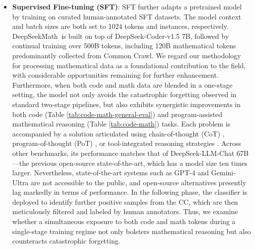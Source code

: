 \begin{itemize}
    \item \textbf{Supervised Fine-tuning (SFT)}: SFT further adapts a pretrained model by training on curated human-annotated SFT datasets. The model context and batch sizes are both set to 1024 tokens and instances, respectively. DeepSeekMath~is built on top of DeepSeek-Coder-v1.5 7B, followed by continual training over 500B tokens, including 120B mathematical tokens predominantly collected from Common Crawl. We regard our methodology for processing mathematical data as a foundational contribution to the field, with considerable opportunities remaining for further enhancement. Furthermore, when both code and math data are blended in a one-stage setting, the model not only avoids the catastrophic forgetting observed in standard two-stage pipelines, but also exhibits synergistic improvements in both code (Table \ref{tab:code-math-general-eval}) and program-assisted mathematical reasoning (Table \ref{tab:code-math}) tasks. Each problem is accompanied by a solution articulated using chain-of-thought (CoT) \citep{cot}, program-of-thought (PoT) \citep{pot,pal}, or tool-integrated reasoning strategies \citep{tora}. Across other benchmarks, its performance matches that of DeepSeek-LLM-Chat 67B—the previous open-source state-of-the-art, which has a model size ten times larger. Nevertheless, state-of-the-art systems such as GPT-4 \citep{gpt4} and Gemini-Ultra \citep{gemini} are not accessible to the public, and open-source alternatives presently lag markedly in terms of performance. In the following phase, the classifier is deployed to identify further positive samples from the CC, which are then meticulously filtered and labeled by human annotators. Thus, we examine whether a simultaneous exposure to both code and math tokens during a single-stage training regime not only bolsters mathematical reasoning but also counteracts catastrophic forgetting. \end{itemize}

